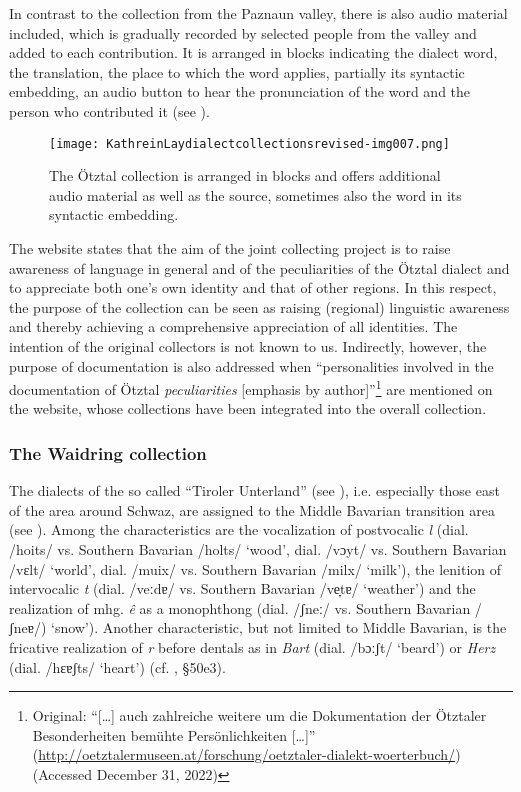 \documentclass[output=paper]{langscibook}
\begin{document}
In contrast to the collection from the Paznaun valley, there is also audio material included, which is gradually recorded by selected people from the valley and added to each contribution. It is arranged in blocks indicating the dialect word, the translation, the place to which the word applies, partially its syntactic embedding, an audio button to hear the pronunciation of the word and the person who contributed it (see ).

 

\begin{figure}
\texttt{[image: KathreinLaydialectcollectionsrevised-img007.png]}
\caption{\label{fig:kathrein:7}The Ötztal collection is arranged in blocks and offers additional audio material as well as the source, sometimes also the word in its syntactic embedding.}
\end{figure}

The website states that the aim of the joint collecting project is to raise awareness of language in general and of the peculiarities of the Ötztal dialect and to appreciate both one’s own identity and that of other regions. In this respect, the purpose of the collection can be seen as raising (regional) linguistic awareness and thereby achieving a comprehensive appreciation of all identities.
The intention of the original collectors is not known to us. Indirectly, however, the purpose of documentation is also addressed when “personalities involved in the documentation of Ötztal \emph{peculiarities} [emphasis by author]”\footnote{Original: “[…] auch zahlreiche weitere um die Dokumentation der Ötztaler Besonderheiten bemühte Persönlichkeiten […]” (\url{http://oetztalermuseen.at/forschung/oetztaler-dialekt-woerterbuch/}) (Accessed December 31, 2022)} are mentioned on the website, whose collections have been integrated into the overall collection.

\subsubsection{The Waidring collection}
\label{sec:kathrein:3.1.3}
The dialects of the so called “Tiroler Unterland” (see ), i.e. especially those east of the area around Schwaz, are assigned to the Middle Bavarian transition area (see ). Among the characteristics are the vocalization of postvocalic \textit{l} (dial. /hoits/ vs. Southern Bavarian /holts/ ‘wood’, dial. /vɔyt/ vs. Southern Bavarian /vɛlt/ ‘world’, dial. /muix/ vs. Southern Bavarian /milx/ ‘milk’), the lenition of intervocalic \textit{t} (dial. /veːdɐ/ vs. Southern Bavarian /ve̞tɐ/ ‘weather’) and the realization of mhg. \textit{ê} as a monophthong (dial. /ʃneː/ vs. Southern Bavarian /ʃneɐ/) ‘snow’). Another characteristic, but not limited to Middle Bavarian, is the fricative realization of \textit{r} before dentals as in \textit{Bart} (dial. /bɔːʃt/ ‘beard’) or \textit{Herz} (dial. /hɛɐʃts/ ‘heart’) (cf. \citealt[125]{Kranzmayer1956}, §50e3). 
\end{document}
